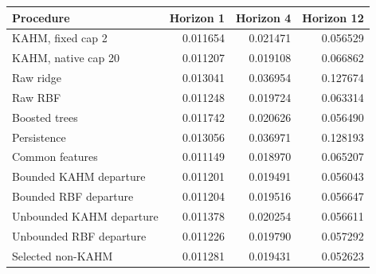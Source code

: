 \begin{tabular}{@{}lrrr@{}}
\toprule
Procedure & Horizon 1 & Horizon 4 & Horizon 12 \\
\midrule
KAHM, fixed cap 2 & 0.011654 & 0.021471 & 0.056529 \\
KAHM, native cap 20 & 0.011207 & 0.019108 & 0.066862 \\
Raw ridge & 0.013041 & 0.036954 & 0.127674 \\
Raw RBF & 0.011248 & 0.019724 & 0.063314 \\
Boosted trees & 0.011742 & 0.020626 & 0.056490 \\
Persistence & 0.013056 & 0.036971 & 0.128193 \\
Common features & 0.011149 & 0.018970 & 0.065207 \\
Bounded KAHM departure & 0.011201 & 0.019491 & 0.056043 \\
Bounded RBF departure & 0.011204 & 0.019516 & 0.056647 \\
Unbounded KAHM departure & 0.011378 & 0.020254 & 0.056611 \\
Unbounded RBF departure & 0.011226 & 0.019790 & 0.057292 \\
Selected non-KAHM & 0.011281 & 0.019431 & 0.052623 \\
\bottomrule
\end{tabular}
